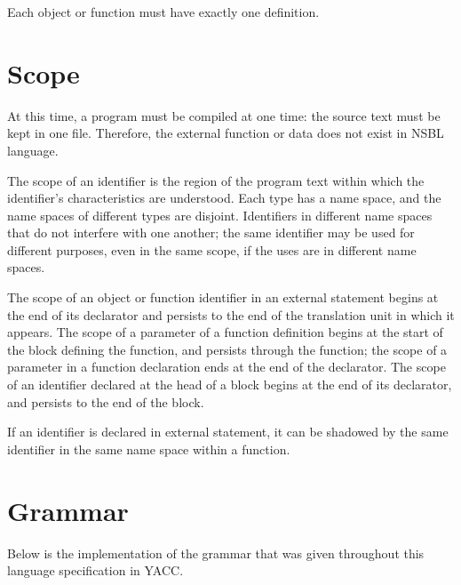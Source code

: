 \documentclass[letterpaper,12pt]{article}
\begin{document}
Each object or function must have exactly one definition. \newline

\section{Scope}\label{sec:scope}
At this time, a program must be compiled at one time: the source text must be kept in one file. Therefore, the external function or data does not exist in NSBL language. \newline

The scope of an identifier is the region of the program text within which the identifier's characteristics are understood. 
Each type has a name space, and the name spaces of different types are disjoint. 
Identifiers in different name spaces that do not interfere with one another; the same identifier may be used for different purposes, even in the same scope, if the uses are in different name spaces. \newline

The scope of an object or function identifier in an external statement begins at the end of its declarator and persists to the end of the translation unit in which it appears. The scope of a parameter of a function definition begins at the start of the block defining the function, and persists through the function; the scope of a parameter in a function declaration ends at the end of the declarator. The scope of an identifier declared at the head of a block begins at the end of its declarator, and persists to the end of the block. \newline

If an identifier is declared in external statement, it can be shadowed by the same identifier in the same name space within a function. 

\section{Grammar}\label{sec:grammar}
Below is the implementation of the grammar that was given throughout this language specification in YACC.

\end{document}
